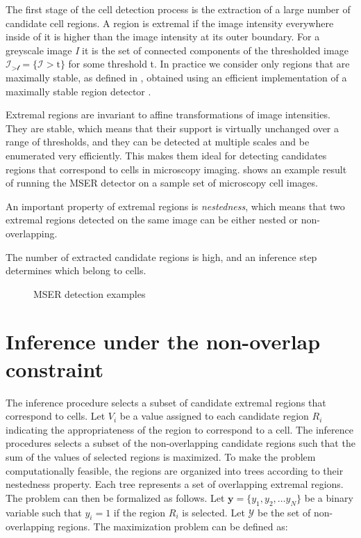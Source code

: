 	The first stage of the cell detection process is the extraction of a large number of candidate cell regions. A region is extremal if the image intensity everywhere inside of it is higher than the image intensity at its outer boundary. For a greyscale image \textit{I} it is the set of connected components of the thresholded image $\mathcal{I_{>\text{t}}} = \{\mathcal{I} > \text{t}\}$ for some threshold t. In practice we consider only regions that are maximally stable, as defined in \cite{matas04}, obtained using an efficient implementation of a maximally stable region detector \cite{vedaldi08vlfeat}.
	
	Extremal regions are invariant to affine transformations of image intensities. They are stable, which means that their support is virtually unchanged over a range of thresholds, and they can be detected at multiple scales and be enumerated very efficiently. This makes them ideal for detecting candidates regions that correspond to cells in microscopy imaging.  shows an example result of running the MSER detector on a sample set of microscopy cell images.
	
	An important property of extremal regions is \textit{nestedness}, which means that two extremal regions detected on the same image can be either nested or non-overlapping.
	
	The number of extracted candidate regions is high, and an inference step determines which belong to cells.
	
	\begin{figure}[h]
		\centering
		\caption{MSER detection examples}
		\label{fig:mserexamplesoncells}
	\end{figure}
	
	\section{Inference under the non-overlap constraint \statusfirstdraft}
	\label{sec:detector_inference}
	
	The inference procedure selects a subset of candidate extremal regions that correspond to cells. Let $V_i$ be a value assigned to each candidate region $R_i$ indicating the appropriateness of the region to correspond to a cell. The inference procedures selects a subset of the non-overlapping candidate regions such that the sum of the values of selected regions is maximized. To make the problem computationally feasible, the regions are organized into trees according to their nestedness property. Each tree represents a set of overlapping extremal regions. The problem can then be formalized as follows. Let $\textbf{y} = \{y_1, y_2, \dots y_N\}$ be a binary variable such that $y_i = 1$ if the region $R_i$ is selected. Let $\mathcal{Y}$ be the set of non-overlapping regions. The maximization problem can be defined as:
	
